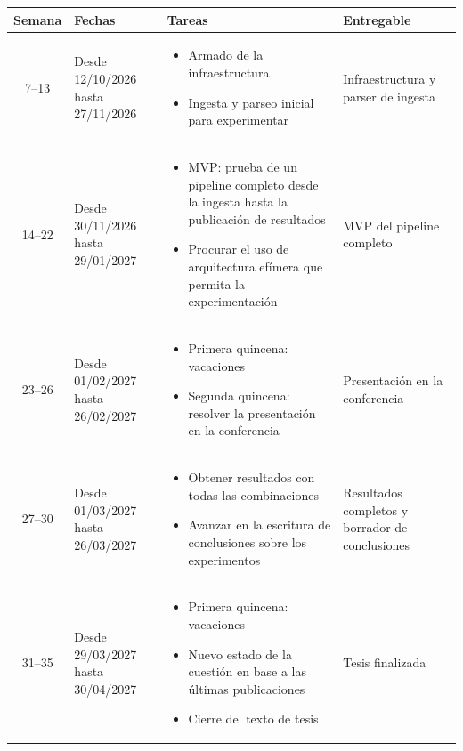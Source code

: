 \documentclass[12pt, a4paper]{article}
\begin{document}
\vspace{0.3cm}
\begin{center}
\small
\renewcommand{\arraystretch}{1.3}

\begin{tabular}{|c|L{3.2cm}|L{6.2cm}|L{3.2cm}|}
\hline
\textbf{Semana} & \textbf{Fechas} & \textbf{Tareas} & \textbf{Entregable} \\ \hline

7--13 & Desde 12/10/2026 hasta 27/11/2026 &
\begin{itemize}[nosep,leftmargin=*,topsep=2pt]
  \item Armado de la infraestructura
  \item Ingesta y parseo inicial para experimentar
\end{itemize} & Infraestructura y parser de ingesta \\ \hline

14--22 & Desde 30/11/2026 hasta 29/01/2027 &
\begin{itemize}[nosep,leftmargin=*,topsep=2pt]
  \item MVP: prueba de un pipeline completo desde la ingesta hasta la publicación de resultados
  \item Procurar el uso de arquitectura efímera que permita la experimentación
\end{itemize} &
MVP del pipeline completo \\ \hline

23--26 & Desde 01/02/2027 hasta 26/02/2027 &
\begin{itemize}[nosep,leftmargin=*,topsep=2pt]
  \item Primera quincena: vacaciones
  \item Segunda quincena: resolver la presentación en la conferencia
\end{itemize} &
Presentación en la conferencia \\ \hline

27--30 & Desde 01/03/2027 hasta 26/03/2027 &
\begin{itemize}[nosep,leftmargin=*,topsep=2pt]
  \item Obtener resultados con todas las combinaciones
  \item Avanzar en la escritura de conclusiones sobre los experimentos
\end{itemize} &
Resultados completos y borrador de conclusiones \\ \hline

31--35 & Desde 29/03/2027 hasta 30/04/2027 &
\begin{itemize}[nosep,leftmargin=*,topsep=2pt]
  \item Primera quincena: vacaciones
  \item Nuevo estado de la cuestión en base a las últimas publicaciones
  \item Cierre del texto de tesis
\end{itemize} &
Tesis finalizada \\ \hline
\end{tabular}
\end{center}
\end{document}
